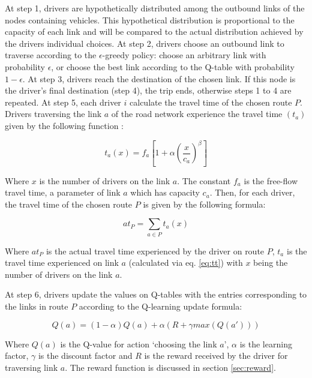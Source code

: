 \documentclass[12pt]{article}
\begin{document}
At step 1, drivers are hypothetically distributed among the outbound links of the nodes containing vehicles. This hypothetical distribution is proportional to the capacity of each link and will be compared to the actual distribution achieved by the drivers individual choices. At step 2, drivers choose an outbound link to traverse according to the $\epsilon$-greedy policy: choose an arbitrary link with probability $\epsilon$, or choose the best link according to the Q-table with probability $1-\epsilon$. At step 3, drivers reach the destination of the chosen link. If this node is the driver's final destination (step 4), the trip ends, otherwise steps 1 to 4 are repeated. At step 5, each driver $i$ calculate the travel time of the chosen route $P$. Drivers traversing the link $a$ of the road network experience the travel time $(t_a)$ given by the following function \cite{Ortuzar&Willumsen2001}:

\begin{equation}
\label{eq:tt}
t_a(x) = f_a[1 + \alpha \left(\frac{x}{c_a}\right)^\beta]
\end{equation}

Where $x$ is the number of drivers on the link $a$. The constant $f_a$ is the free-flow travel time, a parameter of link $a$ which has capacity $c_a$. Then, for each driver, the travel time of the chosen route $P$ is given by the following formula:

\begin{equation}
\label{eq:att}
at_P = \sum_{a \in P} t_a(x)
\end{equation}

Where $at_P$ is the actual travel time experienced by the driver on route $P$, $t_a$ is the travel time experienced on link $a$ (calculated via eq. \eqref{eq:tt}) with $x$ being the number of drivers on the link $a$.

At step 6, drivers update the values on Q-tables with the entries corresponding to the links in route $P$ according to the Q-learning update formula:

\begin{equation}
\label{eq:qlearning}
Q(a) = (1 - \alpha) Q(a) + \alpha (R + \gamma max(Q(a')))
\end{equation}

Where $Q(a)$ is the Q-value for action `choosing the link $a$', $\alpha$ is the learning factor, $\gamma$ is the discount factor and $R$ is the reward received by the driver for traversing link $a$. The reward function is discussed in section \ref{sec:reward}. %
\end{document}

